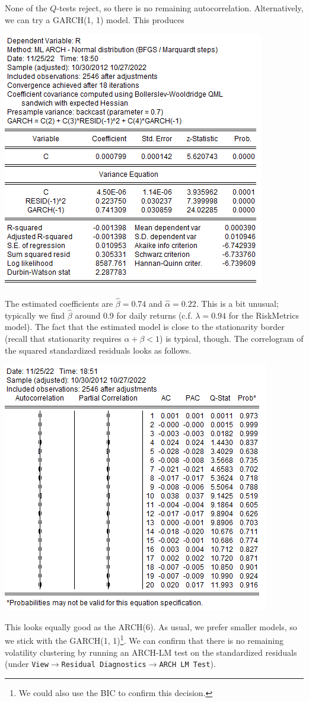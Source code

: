 \documentclass[11pt, a4paper]{article}
\begin{document}
\begin{enumerate}
\begin{enumerate}
\begin{center}
\end{center}
None of the $Q$-tests reject, so there is no remaining autocorrelation.
Alternatively, we can try a GARCH(1, 1) model. This produces
\begin{center}
\includegraphics[width=.6\textwidth]{garch11}
\end{center}
The estimated coefficients are $\hat{\beta}=0.74$ and $\hat\alpha=0.22$. This is a bit unusual; typically we find $\hat\beta$ around 0.9 for daily returns (c.f. $\lambda=0.94$ for the RiskMetrics model). The fact that the estimated model is close to the stationarity border (recall that stationarity requires $\alpha+\beta<1$) is typical, though. The correlogram of the squared standardized residuals looks as follows.
\begin{center}
\includegraphics[width=.6\textwidth]{garch11corrsq}
\end{center}
This looks equally good as the ARCH(6). As usual, we prefer smaller models, so we stick with the GARCH(1, 1)\footnote{We could also use the BIC to confirm this decision.}. We can confirm that there is no remaining volatility clustering by running an ARCH-LM test on the standardized residuals   (under \texttt{View$\rightarrow$Residual Diagnostics$\rightarrow$ARCH LM Test}).

\end{enumerate}
\end{enumerate}
\end{document}
